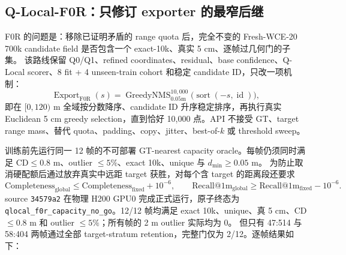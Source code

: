 \documentclass[11pt,a4paper,fontset=none]{ctexart}
\newcommand{\code}[1]{\texttt{#1}}
\begin{document}
\subsection{Q-Local-F0R：只修订 exporter 的最窄后继}

F0R 的问题是：移除已证明矛盾的 range quota 后，完全不变的 Fresh-WCE-20
700k candidate field 是否包含一个 exact-10k、真实 5 cm、逐帧过几何门的子集。
该路线保留 Q0/Q1、refined coordinates、residual、base confidence、Q-Local
scorer、8 fit + 4 unseen-train cohort 和稳定 candidate ID，只改一项机制：
\begin{equation}
  \operatorname{Export}_{\mathrm{F0R}}(s)=
  \operatorname{GreedyNMS}_{0.05\mathrm m}^{10{,}000}
  \bigl(\operatorname{sort}(-s,\operatorname{id})\bigr),
\end{equation}
即在 $[0,120)$ m 全域按分数降序、candidate ID 升序稳定排序，再执行真实
Euclidean 5 cm greedy selection，直到恰好 10,000 点。API 不接受 GT、target
range mass、替代 quota、padding、copy、jitter、best-of-$k$ 或 threshold sweep。

训练前先运行同一 12 帧的不可部署 GT-nearest capacity oracle。每帧仍须同时满足
$\mathrm{CD}\le0.8$ m、outlier $\le5\%$、exact 10k、unique 与 $d_{\min}\ge0.05$ m。
为防止取消硬配额后通过放弃真实中远距 target 获胜，对每个含 target 的距离段还要求
\begin{equation}
  \mathrm{Completeness}_{\mathrm{global}}
  \le \mathrm{Completeness}_{\mathrm{fixed}}+10^{-6},\qquad
  \mathrm{Recall@1m}_{\mathrm{global}}
  \ge \mathrm{Recall@1m}_{\mathrm{fixed}}-10^{-6}.
\end{equation}
source \code{34579a2} 在物理 H200 GPU0 完成正式运行，原子终态为
\code{qlocal\_f0r\_capacity\_no\_go}。12/12 帧均满足 exact 10k、unique、真
5 cm、CD $\le0.8$ m 和 outlier $\le5\%$；所有帧的 2 m outlier 实际均为 0。
但只有 47:514 与 58:404 两帧通过全部 target-stratum retention，完整门仅为
2/12。逐帧结果如下：
\end{document}
